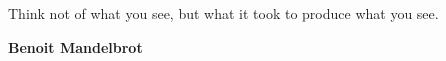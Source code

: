 Think not of what you see, but what it took to produce what you see.

\bigskip
\textbf{Benoit Mandelbrot}